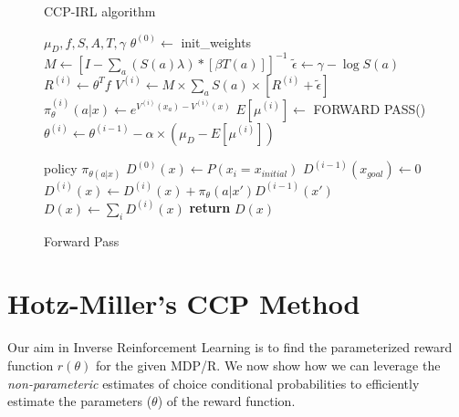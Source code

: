 \documentclass{article}
\begin{document}
\begin{figure}[ht]
\begin{minipage}[t]{0.45\textwidth}
  \begin{algorithm}[H]
    \caption{CCP-IRL algorithm} \label{algo:ccp_irl_algorithm}
    \begin{algorithmic}[1]
         $\mu_D,f, S, A, T, \gamma$
        \STATE $\theta^{(0)} \gets$ init\_weights
        \STATE $M \gets \left[I-\sum_{a}(S(a) \lambda) *\left[ \beta T(a)  \right]\right]^{-1}$ 
        \STATE $\tilde{\epsilon} \gets \gamma - \log S(a)$
            \STATE $R^{(i)} \gets \theta^T f$
            \STATE $V^{(i)} \gets M \times \sum_{a}{S(a) \times \left[ R^{(i)} +\tilde{\epsilon}\right]}$
            \STATE $\pi_{\theta}^{(i)}(a|x) \gets e^{V^{(i)}(x_a) - V^{(i)}(x)}$
            \STATE $E[\mu^{(i)}] \gets $ FORWARD PASS()
            \STATE $\theta^{(i)} \gets \theta^{(i-1)} - \alpha \times (\mu_D - E[\mu^{(i)}])$
        \ENDFOR
    \end{algorithmic}
  \end{algorithm}
\end{minipage}%
\qquad
\begin{minipage}[t]{0.45\textwidth}
  \begin{algorithm}[H]
    \caption{Forward Pass} \label{algo:forward_pass_algorithm}
    \begin{algorithmic}[1]
         policy $\pi_{\theta(a|x)}$
        \STATE $D^{(0)}(x) \gets P(x_i = x_{initial})$
            \STATE $D^{(i-1)}(x_{goal}) \gets 0$
            \STATE $D^{(i)}(x) \gets D^{(i)}(x) + \pi_{\theta}(a|x') D^{(i-1)}(x')$
        \ENDFOR
        \STATE $D(x) \gets \sum_{i}D^{(i)}(x)$ 
        \STATE \textbf{return} $D(x)$
    \end{algorithmic}
  \end{algorithm}
\end{minipage}
\end{figure}


\section{Hotz-Miller's CCP Method}

Our aim in Inverse Reinforcement Learning is to find the parameterized reward function $r(\theta)$ for the given MDP/R. We now show how we can leverage the \textit{non-parameteric} estimates of choice conditional probabilities to efficiently estimate the parameters ($\theta$) of the reward function. 
\end{document}
